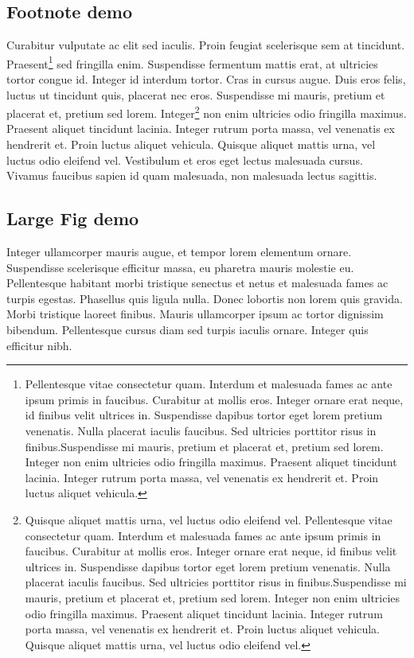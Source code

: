 \documentclass[./main.tex]{subfiles}
\begin{document}
\subsection{Footnote demo} \label{sec:intro:3}

\par Curabitur vulputate ac elit sed iaculis. Proin feugiat scelerisque sem at tincidunt. Praesent\footnote{Pellentesque vitae consectetur quam. Interdum et malesuada fames ac ante ipsum primis in faucibus. Curabitur at mollis eros. Integer ornare erat neque, id finibus velit ultrices in. Suspendisse dapibus tortor eget lorem pretium venenatis. Nulla placerat iaculis faucibus. Sed ultricies porttitor risus in finibus.Suspendisse mi mauris, pretium et placerat et, pretium sed lorem. Integer non enim ultricies odio fringilla maximus. Praesent aliquet tincidunt lacinia. Integer rutrum porta massa, vel venenatis ex hendrerit et. Proin luctus aliquet vehicula.} sed fringilla enim. Suspendisse fermentum mattis erat, at ultricies tortor congue id. Integer id interdum tortor. Cras in cursus augue. Duis eros felis, luctus ut tincidunt quis, placerat nec eros. Suspendisse mi mauris, pretium et placerat et, pretium sed lorem. Integer\footnote{Quisque aliquet mattis urna, vel luctus odio eleifend vel. Pellentesque vitae consectetur quam. Interdum et malesuada fames ac ante ipsum primis in faucibus. Curabitur at mollis eros. Integer ornare erat neque, id finibus velit ultrices in. Suspendisse dapibus tortor eget lorem pretium venenatis. Nulla placerat iaculis faucibus. Sed ultricies porttitor risus in finibus.Suspendisse mi mauris, pretium et placerat et, pretium sed lorem. Integer non enim ultricies odio fringilla maximus. Praesent aliquet tincidunt lacinia. Integer rutrum porta massa, vel venenatis ex hendrerit et. Proin luctus aliquet vehicula. Quisque aliquet mattis urna, vel luctus odio eleifend vel.} non enim ultricies odio fringilla maximus. Praesent aliquet tincidunt lacinia. Integer rutrum porta massa, vel venenatis ex hendrerit et. Proin luctus aliquet vehicula. Quisque aliquet mattis urna, vel luctus odio eleifend vel. Vestibulum et eros eget lectus malesuada cursus. Vivamus faucibus sapien id quam malesuada, non malesuada lectus sagittis. 

\subsection{Large Fig demo} \label{sec:intro:4}

\par Integer ullamcorper mauris augue, et tempor lorem elementum ornare. Suspendisse scelerisque efficitur massa, eu pharetra mauris molestie eu. Pellentesque habitant morbi tristique senectus et netus et malesuada fames ac turpis egestas. Phasellus quis ligula nulla. Donec lobortis non lorem quis gravida. Morbi tristique laoreet finibus. Mauris ullamcorper ipsum ac tortor dignissim bibendum. Pellentesque cursus diam sed turpis iaculis ornare. Integer quis efficitur nibh.
\end{document}
